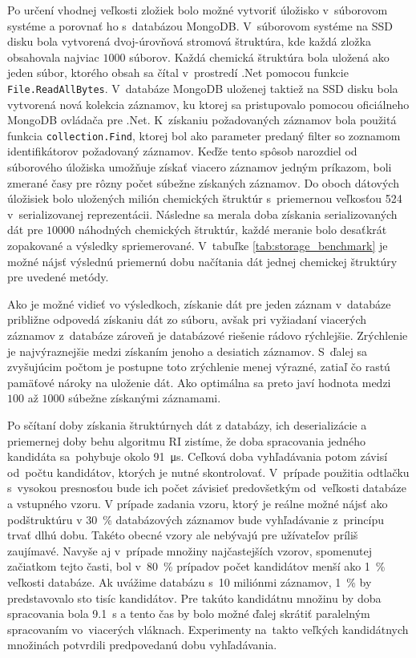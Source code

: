 \documentclass[slovak]{ExcelAtFIT} %
\begin{document}
Po určení vhodnej veľkosti zložiek bolo možné vytvoriť úložisko v~súborovom systéme a porovnať ho s~databázou MongoDB. V~súborovom systéme na SSD disku bola vytvorená dvoj-úrovňová stromová štruktúra, kde každá zložka obsahovala najviac $1000$ súborov. Každá chemická štruktúra bola uložená ako jeden súbor, ktorého obsah sa čítal v~prostredí .Net pomocou funkcie \texttt{File.ReadAllBytes}. V~databáze MongoDB uloženej taktiež na SSD disku bola vytvorená nová kolekcia záznamov, ku ktorej sa pristupovalo pomocou oficiálneho MongoDB ovládača pre .Net. K~získaniu požadovaných záznamov bola použitá funkcia \texttt{collection.Find}, ktorej bol ako parameter predaný filter so zoznamom identifikátorov požadovaný záznamov. Keďže tento spôsob narozdiel od súborového úložiska umožňuje získať viacero záznamov jedným príkazom, boli zmerané časy pre rôzny počet súbežne získaných záznamov. Do oboch dátových úložisiek bolo uložených milión chemických štruktúr s~priemernou veľkosťou \SI{524}{\byte} v~serializovanej reprezentácii. Následne sa merala doba získania serializovaných dát pre $10000$ náhodných chemických štruktúr, každé meranie bolo desaťkrát zopakované a výsledky spriemerované. V~tabuľke \ref{tab:storage_benchmark} je možné nájsť výslednú priemernú dobu načítania dát jednej chemickej štruktúry pre uvedené metódy.

Ako je možné vidieť vo výsledkoch, získanie dát pre jeden záznam v~databáze približne odpovedá zí\-ska\-niu dát zo súboru, avšak pri vyžiadaní viacerých záznamov z~databáze zároveň je databázové riešenie rádovo rý\-chlej\-šie. Zrýchlenie je najvýraznejšie medzi získaním jenoho a desiatich záznamov. S~ďalej sa zvyšujúcim počtom je postupne toto zrýchlenie menej výrazné, zatiaľ čo rastú pamäťové nároky na uloženie dát. Ako optimálna sa preto javí hodnota medzi $100$ až $1000$ súbežne získanými záznamami.

Po sčítaní doby získania štruktúrnych dát z databázy, ich deserializácie a priemernej doby behu algoritmu RI zistíme, že doba spracovania jedného kandidáta sa~pohybuje okolo \SI{91}{\micro\second}. Ceľková doba vy\-hľa\-dá\-va\-nia potom závisí od~počtu kandidátov, ktorých je nutné skontrolovať. V~prípade použitia odtlačku s~vysokou presnosťou bude ich počet závisieť predovšetkým od~veľ\-ko\-sti databáze a vstupného vzoru. V prípade zadania vzoru, ktorý je reálne možné nájsť ako podštruktúru v \SI{30}{\percent} databázových záznamov bude vyhľadávanie z~prin\-cí\-pu trvať dlhú dobu. Takéto obecné vzory ale ne\-bý\-va\-jú pre užívateľov príliš za\-u\-jí\-ma\-vé. Navyše aj v~prípade množiny najčastejších vzorov, spomenutej začiatkom tejto časti, bol v~\SI{80}{\percent} prípadov počet kandidátov menší ako \SI{1}{\percent} veľkosti databáze. Ak uvážime databázu s~10 miliónmi záznamov, \SI{1}{\percent} by predstavovalo sto tisíc kandidátov. Pre takúto kandidátnu mno\-ži\-nu by doba spracovania bola \SI{9.1}{\second} a tento čas by bolo možné ďalej skrátiť paralelným spracovaním vo~viacerých vláknach. Experimenty na~takto veľkých kandidátnych množinách potvrdili predpovedanú dobu vyhľadávania. 
\end{document}
